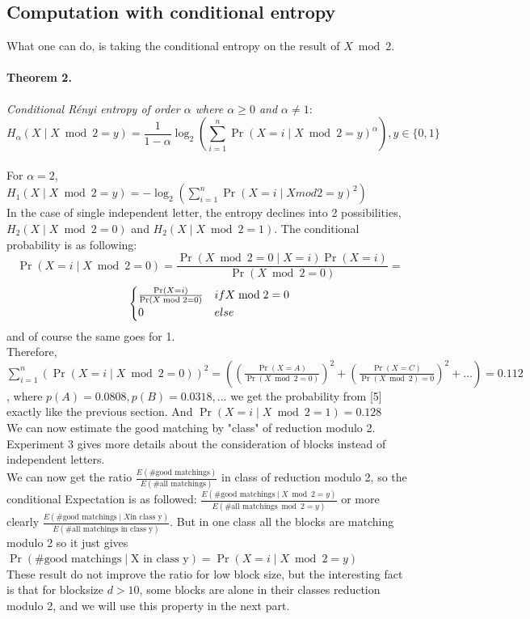 \documentclass{article}
\begin{document}
\subsection{Computation with conditional entropy}
What one can do, is taking the conditional entropy on the result of $X \bmod 2$.\\
\paragraph{Theorem 2.}\textit{Conditional R\'enyi entropy of order $\alpha$ where $\alpha \geq 0$ and $\alpha \neq 1$}:
$$H_{\alpha}(X \mid X \bmod 2 = y) = \frac{1}{1-\alpha}\log_{2}(\sum_{i=1}^{n}{\Pr(X=i \mid X \bmod 2= y )^{\alpha}}), y \in \{0,1\} $$\\
For $\alpha = 2$, $H_{1}(X \mid X \bmod 2 = y) = -\log_{2}(\sum_{i=1}^{n}{\Pr (X=i \mid X mod2 = y)^{2}})$\\
In the case of single independent letter, the entropy declines into 2 possibilities, $H_{2}(X \mid X \bmod 2 = 0) $ and $H_{2}(X \mid X \bmod 2 = 1)$. The conditional probability is as following:
$$\Pr (X=i \mid X \bmod 2 = 0 ) = \frac{\Pr(X \bmod 2 = 0 \mid X = i) \Pr(X=i)}{\Pr(X \bmod 2 =0)} = $$
\[ \begin{cases}
      \frac{\Pr(X=i)}{\Pr(X \bmod 2 =0)} $$ & if X \bmod 2 =0  \\
      0 & else
   \end{cases}
\]
and of course the same goes for 1.\\

Therefore, $\sum_{i=1}^{n}{(\Pr (X=i \mid X \bmod 2 = 0))^{2}} = ((\frac{\Pr(X=A)}{\Pr(X \bmod 2 = 0)})^{2} + (\frac{\Pr(X=C)}{\Pr(X \bmod 2) = 0})^{2} +... )= 0.112$, where $p(A)=0.0808, p(B)=0.0318,...$  we get the probability from [5] exactly like the previous section.
And $\Pr(X=i \mid X \bmod 2 = 1) = 0.128$\\
We can now estimate the good matching by "class" of reduction modulo 2. Experiment 3 gives more details about the consideration of blocks instead of independent letters.\\
We can now get the ratio $\frac{E(\# \text{good matchings})}{E(\# \text{all matchings})}$ in class of reduction modulo 2, so the conditional Expectation is as followed: $\frac{E(\# \text{good matchings} \mid X \bmod 2 = y)}{E(\# \text{all matchings} \bmod 2 = y)}$ or more clearly $\frac{E(\# \text{good matchings} \mid X \text{in class y})}{E(\# \text{all matchings in class y})}$. But in one class all the blocks are matching modulo 2 so it just gives $\Pr(\# \text{good matchings} \mid \text{X in class y})  = \Pr (X=i \mid X \bmod 2 = y) $\\
These result do not improve the ratio for low block size, but the interesting fact is that for blocksize $d>10$, some blocks are alone in their classes reduction modulo 2, and we will use this property in the next part.
\end{document}
